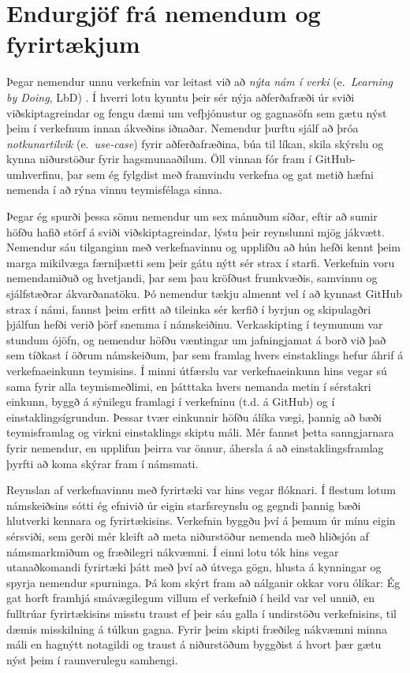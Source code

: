 \documentclass{article}
\begin{document}
\section*{Endurgjöf frá nemendum og fyrirtækjum}
Þegar nemendur unnu verkefnin var leitast við að \textit{nýta nám í verki} (e.~\emph{Learning by Doing}, LbD) \citep{Bruce2012}. Í hverri lotu kynntu þeir sér nýja aðferðafræði úr sviði viðskiptagreindar og fengu dæmi um vefþjónustur og gagnasöfn sem gætu nýst þeim í verkefnum innan ákveðins iðnaðar. Nemendur þurftu sjálf að þróa \textit{notkunartilvik} (e.~\emph{use-case}) fyrir aðferðafræðina, búa til líkan, skila skýrslu og kynna niðurstöður fyrir hagsmunaaðilum. Öll vinnan fór fram í GitHub-umhverfinu, þar sem ég fylgdist með framvindu verkefna og gat metið hæfni nemenda í að rýna vinnu teymisfélaga sinna.

Þegar ég spurði þessa sömu nemendur um sex mánuðum síðar, eftir að sumir höfðu hafið störf á sviði viðskiptagreindar, lýstu þeir reynslunni mjög jákvætt. Nemendur sáu tilganginn með verkefnavinnu og upplifðu að hún hefði kennt þeim marga mikilvæga færniþætti sem þeir gátu nýtt sér strax í starfi. Verkefnin voru nemendamiðuð og hvetjandi, þar sem þau kröfðust frumkvæðis, samvinnu og sjálfstæðrar ákvarðanatöku. Þó nemendur tækju almennt vel í að kynnast GitHub strax í námi, fannst þeim erfitt að tileinka sér kerfið í byrjun og skipulagðri þjálfun hefði verið þörf snemma í námskeiðinu. Verkaskipting í teymunum var stundum ójöfn, og nemendur höfðu væntingar um jafningjamat á borð við það sem tíðkast í öðrum námskeiðum, þar sem framlag hvers einstaklings hefur áhrif á verkefnaeinkunn teymisins. Í minni útfærslu var verkefnaeinkunn hins vegar sú sama fyrir alla teymismeðlimi, en þátttaka hvers nemanda metin í sérstakri einkunn, byggð á sýnilegu framlagi í verkefninu (t.d. á GitHub) og í einstaklingsígrundun. Þessar tvær einkunnir höfðu álíka vægi, þannig að bæði teymisframlag og virkni einstaklings skiptu máli. Mér fannst þetta sanngjarnara fyrir nemendur, en upplifun þeirra var önnur, áhersla á að einstaklingsframlag þyrfti að koma skýrar fram í námsmati.

Reynslan af verkefnavinnu með fyrirtæki var hins vegar flóknari. Í flestum lotum námskeiðsins sótti ég efnivið úr eigin starfsreynslu og gegndi þannig bæði hlutverki kennara og fyrirtækisins. Verkefnin byggðu því á þemum úr mínu eigin sérsviði, sem gerði mér kleift að meta niðurstöður nemenda með hliðsjón af námsmarkmiðum og fræðilegri nákvæmni. Í einni lotu tók hins vegar utanaðkomandi fyrirtæki þátt með því að útvega gögn, hlusta á kynningar og spyrja nemendur spurninga. Þá kom skýrt fram að nálganir okkar voru ólíkar: Ég gat horft framhjá smávægilegum villum ef verkefnið í heild var vel unnið, en fulltrúar fyrirtækisins misstu traust ef þeir sáu galla í undirstöðu verkefnisins, til dæmis misskilning á túlkun gagna. Fyrir þeim skipti fræðileg nákvæmni minna máli en hagnýtt notagildi og traust á niðurstöðum byggðist á hvort þær gætu nýst þeim í raunverulegu samhengi.
\end{document}
